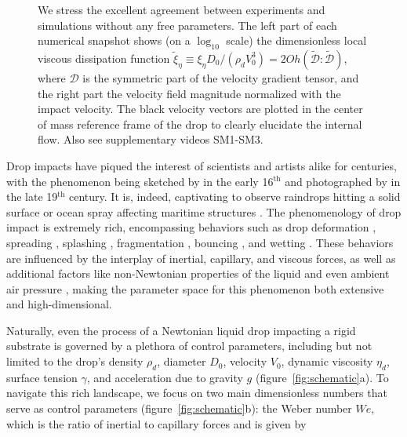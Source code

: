 \documentclass{jfm}
\begin{document}
\begin{figure}
{			We stress the excellent agreement between experiments and simulations without any free parameters.
			The left part of each numerical snapshot shows (on a $\log_{10}$ scale) the dimensionless local viscous dissipation function $\tilde{\xi}_\eta \equiv \xi_\eta D_0/\left(\rho_dV_0^3\right) = 2Oh\left(\boldsymbol{\tilde{\mathcal{D}}:\tilde{\mathcal{D}}}\right)$, where $\boldsymbol{\mathcal{D}}$ is the symmetric part of the velocity gradient tensor, and the right part the velocity field magnitude normalized with the impact velocity. The black velocity vectors are plotted in the center of mass reference frame of the drop to clearly elucidate the internal flow.  Also see supplementary videos SM1-SM3.}
		\label{fig:summary}
	\end{figure}
	
	Drop impacts have piqued the interest of scientists and artists alike for centuries, with the phenomenon being sketched by \citet{da1508notebooks} in the early 16$^{\text{th}}$ and photographed by \citet{worthington1876, worthington1876b} in the late 19$^{\text{th}}$ century. It is, indeed, captivating to observe raindrops hitting a solid surface \citep{kim2020raindrop, lohse-2020-pnas} or ocean spray affecting maritime structures \citep{berny2021statistics, villermaux2022bubbles}. The phenomenology of drop impact is extremely rich, encompassing behaviors such as drop deformation \citep{Biance2006, molavcek2012quasi, chevy2012liquid}, spreading \citep{laan2014maximum, Wildeman2016}, splashing \citep{xu2005drop, riboux2014experiments, thoraval2021nanoscopic}, fragmentation \citep{villermaux2011drop, villermaux2020fragmentation}, bouncing \citep{Richard2000, kolinski-2014-epl, Jha2020, chubynsky-2020-prl, sharma-2021-jfm, sanjay_chantelot_lohse_2023}, and wetting \citep{degennes-1985-rmp, fukai-1995-pof, quere-2008-arms, Bonn2009}. These behaviors are influenced by the interplay of inertial, capillary, and viscous forces, as well as additional factors like non-Newtonian properties \citep{bartolo2005retraction, bartolo2007dynamics,  smith-2010-prl, gorin-2022-langmuir} of the liquid and even ambient air pressure \citep{xu2005drop}, making the parameter space for this phenomenon both extensive and high-dimensional. 
	
	Naturally, even the process of a Newtonian liquid drop impacting a rigid substrate is governed by a plethora of control parameters, including but not limited to the drop's density $\rho_d$, diameter $D_0$, velocity $V_0$, dynamic viscosity $\eta_d$, surface tension $\gamma$, and acceleration due to gravity $g$ (figure~\ref{fig:schematic}a). 
	To navigate this rich landscape, we focus on two main dimensionless numbers that serve as control parameters (figure~\ref{fig:schematic}b): the Weber number $We$, which is the ratio of inertial to capillary forces and is given by
	
\end{document}
